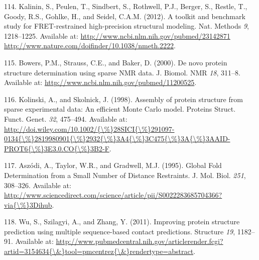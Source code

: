 \documentclass[11pt,a4paper,twoside]{book}
\theoremstyle{definition}
\theoremstyle{definition}
\theoremstyle{remark}
\begin{document}
\hypertarget{ref-Kalinin2012}{}
114. Kalinin, S., Peulen, T., Sindbert, S., Rothwell, P.J., Berger, S.,
Restle, T., Goody, R.S., Gohlke, H., and Seidel, C.A.M. (2012). A
toolkit and benchmark study for FRET-restrained high-precision
structural modeling. Nat. Methods \emph{9}, 1218--1225. Available at:
\href{http://www.ncbi.nlm.nih.gov/pubmed/23142871\%20http://www.nature.com/doifinder/10.1038/nmeth.2222}{http://www.ncbi.nlm.nih.gov/pubmed/23142871 http://www.nature.com/doifinder/10.1038/nmeth.2222}.

\hypertarget{ref-Bowers2000}{}
115. Bowers, P.M., Strauss, C.E., and Baker, D. (2000). De novo protein
structure determination using sparse NMR data. J. Biomol. NMR \emph{18},
311--8. Available at: \url{http://www.ncbi.nlm.nih.gov/pubmed/11200525}.

\hypertarget{ref-Kolinski1998}{}
116. Kolinski, A., and Skolnick, J. (1998). Assembly of protein
structure from sparse experimental data: An efficient Monte Carlo model.
Proteins Struct. Funct. Genet. \emph{32}, 475--494. Available at:
\href{http://doi.wiley.com/10.1002/\%7B/\%\%7D28SICI\%7B/\%\%7D291097-0134\%7B/\%\%7D2819980901\%7B/\%\%7D2932\%7B/\%\%7D3A4\%7B/\%\%7D3C475\%7B/\%\%7D3A\%7B/\%\%7D3AAID-PROT6\%7B/\%\%7D3E3.0.CO\%7B/\%\%7D3B2-F}{http://doi.wiley.com/10.1002/\{\textbackslash{}\%\}28SICI\{\textbackslash{}\%\}291097-0134\{\textbackslash{}\%\}2819980901\{\textbackslash{}\%\}2932\{\textbackslash{}\%\}3A4\{\textbackslash{}\%\}3C475\{\textbackslash{}\%\}3A\{\textbackslash{}\%\}3AAID-PROT6\{\textbackslash{}\%\}3E3.0.CO\{\textbackslash{}\%\}3B2-F}.

\hypertarget{ref-Aszodi1995a}{}
117. Aszódi, A., Taylor, W.R., and Gradwell, M.J. (1995). Global Fold
Determination from a Small Number of Distance Restraints. J. Mol. Biol.
\emph{251}, 308--326. Available at:
\href{http://www.sciencedirect.com/science/article/pii/S0022283685704366?via\%7B/\%\%7D3Dihub}{http://www.sciencedirect.com/science/article/pii/S0022283685704366?via\{\textbackslash{}\%\}3Dihub}.

\hypertarget{ref-Wu2011}{}
118. Wu, S., Szilagyi, A., and Zhang, Y. (2011). Improving protein
structure prediction using multiple sequence-based contact predictions.
Structure \emph{19}, 1182--91. Available at:
\href{http://www.pubmedcentral.nih.gov/articlerender.fcgi?artid=3154634\%7B/\&\%7Dtool=pmcentrez\%7B/\&\%7Drendertype=abstract}{http://www.pubmedcentral.nih.gov/articlerender.fcgi?artid=3154634\{\textbackslash{}\&\}tool=pmcentrez\{\textbackslash{}\&\}rendertype=abstract}.
\end{document}

